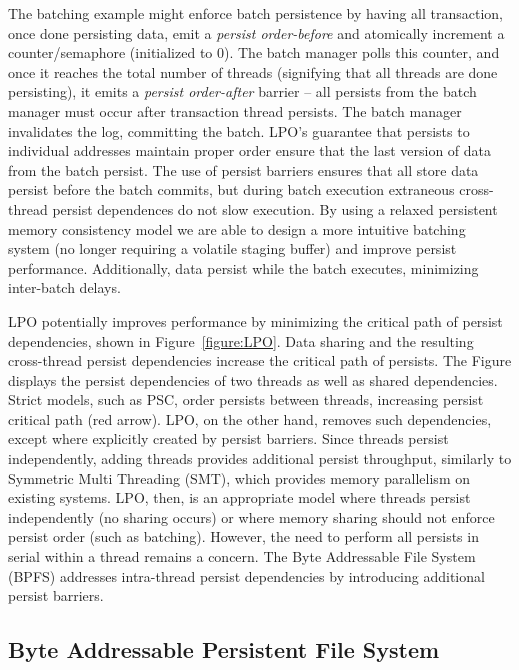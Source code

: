 The batching example might enforce batch persistence by having all transaction, once done persisting data, emit a \emph{persist order-before} and atomically increment a counter/semaphore (initialized to 0).
The batch manager polls this counter, and once it reaches the total number of threads (signifying that all threads are done persisting), it emits a \emph{persist order-after} barrier -- all persists from the batch manager must occur after transaction thread persists.
The batch manager invalidates the log, committing the batch.
LPO's guarantee that persists to individual addresses maintain proper order ensure that the last version of data from the batch persist.
The use of persist barriers ensures that all store data persist before the batch commits, but during batch execution extraneous cross-thread persist dependences do not slow execution.
By using a relaxed persistent memory consistency model we are able to design a more intuitive batching system (no longer requiring a volatile staging buffer) and improve persist performance.
Additionally, data persist while the batch executes, minimizing inter-batch delays.


LPO potentially improves performance by minimizing the critical path of persist dependencies, shown in Figure~\ref{figure:LPO}.
Data sharing and the resulting cross-thread persist dependencies increase the critical path of persists.
The Figure displays the persist dependencies of two threads as well as shared dependencies.
Strict models, such as PSC, order persists between threads, increasing persist critical path (red arrow).
LPO, on the other hand, removes such dependencies, except where explicitly created by persist barriers.
Since threads persist independently, adding threads provides additional persist throughput, similarly to Symmetric Multi Threading (SMT), which provides memory parallelism on existing systems.
LPO, then, is an appropriate model where threads persist independently (no sharing occurs) or where memory sharing should not enforce persist order (such as batching).
However, the need to perform all persists in serial within a thread remains a concern.
The Byte Addressable File System (BPFS) addresses intra-thread persist dependencies by introducing additional persist barriers.

\subsection{Byte Addressable Persistent File System}
\label{sec:PMC:PersistenceModels:BPFS}


